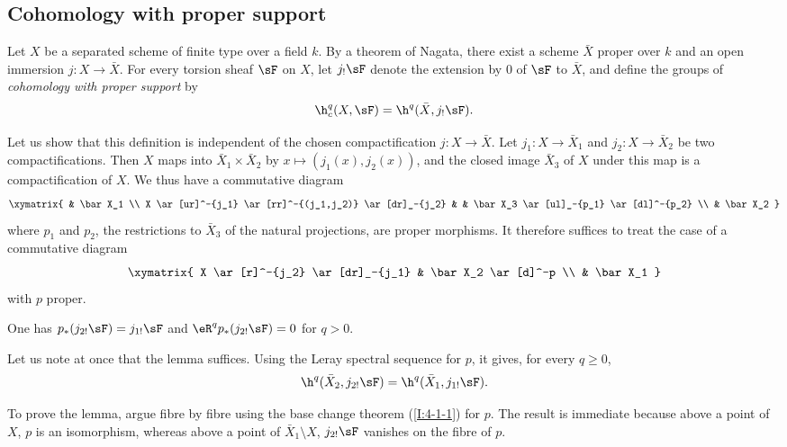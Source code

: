 \documentclass[oneside]{book}
\begin{document}
\subsection{Cohomology with proper support}\label{I:4-5}

\begin{definition}\label{I:4-5-1}
Let $X$ be a separated scheme of finite type over a field $k$. By a
theorem of Nagata, there exist a scheme $\bar X$ proper over $k$ and an
open immersion $j:X\to\bar X$. For every torsion sheaf $\sF$ on $X$,
let $j_!\sF$ denote the extension by $0$ of $\sF$ to $\bar X$, and
define the groups of \emph{cohomology with proper support} by
\[
  \h_c^q(X,\sF)=\h^q(\bar X, j_! \sF) \text{.}
\]
\end{definition}

Let us show that this definition is independent of the chosen
compactification $j:X\to\bar X$. Let $j_1:X\to\bar X_1$ and
$j_2:X\to\bar X_2$ be two compactifications. Then $X$ maps into
$\bar X_1\times\bar X_2$ by $x\mapsto(j_1(x),j_2(x))$, and
the closed image $\bar X_3$ of $X$ under this map is a compactification
of $X$. We thus have a commutative diagram
\[\xymatrix{
  & \bar X_1 \\
  X \ar[ur]^-{j_1} \ar[rr]^-{(j_1,j_2)} \ar[dr]_-{j_2}
    & & \bar X_3 \ar[ul]_-{p_1} \ar[dl]^-{p_2} \\
  & \bar X_2
}\]
where $p_1$ and $p_2$, the restrictions to $\bar X_3$ of the natural
projections, are proper morphisms. It therefore suffices to treat the case
of a commutative diagram
\[\xymatrix{
  X \ar[r]^-{j_2} \ar[dr]_-{j_1}
    & \bar X_2 \ar[d]^-p \\
  & \bar X_1
}\]
with $p$ proper.

\begin{lemma}\label{I:4-5-2}
One has $p_*(j_{2!}\sF)=j_{1!}\sF$ and
$\eR^qp_*(j_{2!}\sF)=0$ for $q>0$.
\end{lemma}

Let us note at once that the lemma suffices. Using the Leray spectral
sequence for $p$, it gives, for every $q\geqslant0$,
\[
  \h^q(\bar X_2, j_{2!} \sF) = \h^q(\bar X_1, j_{1!} \sF) \text{.}
\]

To prove the lemma, argue fibre by fibre using the base change theorem
(\ref{I:4-1-1}) for $p$. The result is immediate because above a point
of $X$, $p$ is an isomorphism, whereas above a point of
$\bar X_1\setminus X$, $j_{2!}\sF$ vanishes on the fibre of $p$.

\subsubsection{}\label{I:4-5-3}
\end{document}
